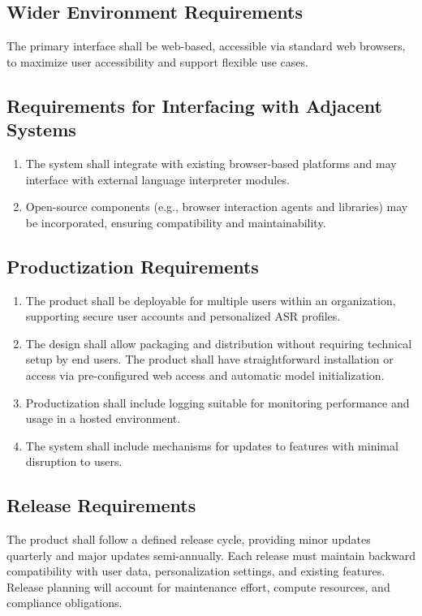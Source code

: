 \documentclass[11pt]{article}
\begin{document}
\subsection{Wider Environment Requirements}
The primary interface shall be web-based, accessible via standard web browsers, to maximize user accessibility and support flexible use cases.
\subsection{Requirements for Interfacing with Adjacent Systems}
\begin{enumerate}
    \item The system shall integrate with existing browser-based platforms and may interface with external language interpreter modules.
    \item Open-source components (e.g., browser interaction agents and libraries) may be incorporated, ensuring compatibility and maintainability.
\end{enumerate}

\subsection{Productization Requirements}
\begin{enumerate}
    \item The product shall be deployable for multiple users within an organization, supporting secure user accounts and personalized ASR profiles.
    \item The design shall allow packaging and distribution without requiring technical setup by end users. The product shall have straightforward installation or access via pre-configured web access and automatic model initialization.
    \item Productization shall include logging suitable for monitoring performance and usage in a hosted environment.
    \item The system shall include mechanisms for updates to features with minimal disruption to users.
\end{enumerate}
\subsection{Release Requirements}
The product shall follow a defined release cycle, providing minor updates quarterly and major updates semi-annually. Each release must maintain backward compatibility with user data, personalization settings, and existing features. Release planning will account for maintenance effort, compute resources, and compliance obligations.
\end{document}
